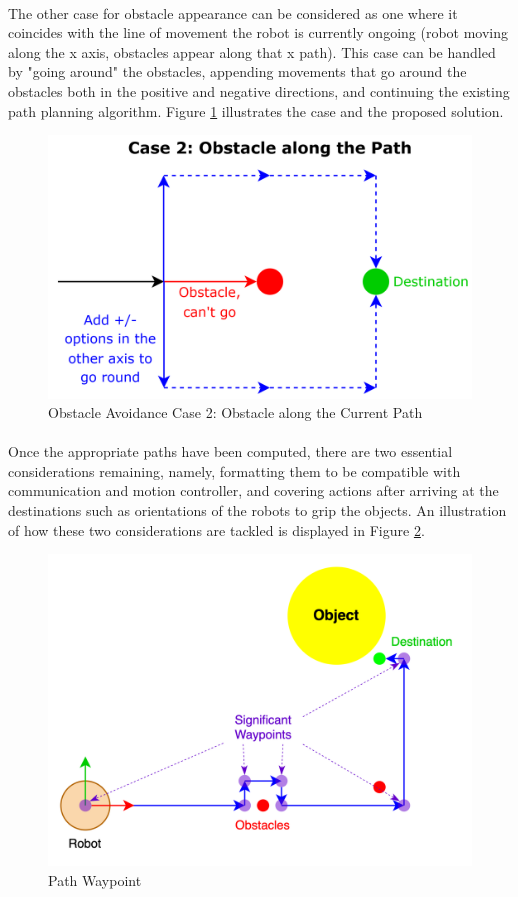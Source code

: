 \paragraph*{}
The other case for obstacle appearance can be considered as one where it coincides with the line of movement the robot is currently ongoing (robot moving along the x axis, obstacles appear along that x path). This case can be handled by "going around" the obstacles, appending movements that go around the obstacles both in the positive and negative directions, and continuing the existing path planning algorithm. Figure \ref{fig:obstacle-avoidance-case-2} illustrates the case and the proposed solution.

\begin{figure} [H]
    \centering
    \includegraphics[width=0.75\linewidth]{assets/images/formation/obstacle-avoidance-case2.png}
    \caption{Obstacle Avoidance Case 2: Obstacle along the Current Path}
    \label{fig:obstacle-avoidance-case-2}
\end{figure}

\paragraph*{}
Once the appropriate paths have been computed, there are two essential considerations remaining, namely, formatting them to be compatible with communication and motion controller, and covering actions after arriving at the destinations such as orientations of the robots to grip the objects. An illustration of how these two considerations are tackled is displayed in Figure \ref{fig:path-waypoint}.

\begin{figure} [H]
    \centering
    \includegraphics[width=0.7\linewidth]{assets/images/formation/path-waypoint.png}
    \caption{Path Waypoint}
    \label{fig:path-waypoint}
\end{figure}

